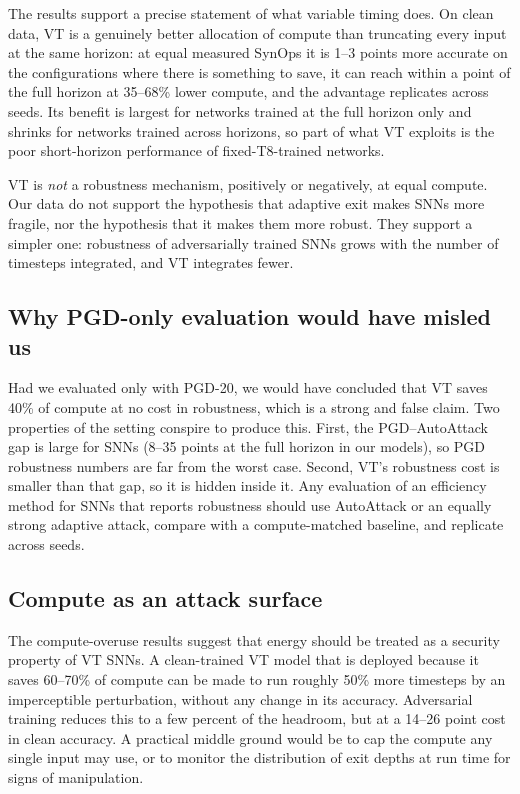 The results support a precise statement of what variable timing does. On clean data, VT is a genuinely better allocation of compute than truncating every input at the same horizon: at equal measured SynOps it is 1--3 points more accurate on the configurations where there is something to save, it can reach within a point of the full horizon at 35--68\% lower compute, and the advantage replicates across seeds. Its benefit is largest for networks trained at the full horizon only and shrinks for networks trained across horizons, so part of what VT exploits is the poor short-horizon performance of fixed-T8-trained networks.

VT is \emph{not} a robustness mechanism, positively or negatively, at equal compute. Our data do not support the hypothesis that adaptive exit makes SNNs more fragile, nor the hypothesis that it makes them more robust. They support a simpler one: robustness of adversarially trained SNNs grows with the number of timesteps integrated, and VT integrates fewer.

\subsection{Why PGD-only evaluation would have misled us}

Had we evaluated only with PGD-20, we would have concluded that VT saves 40\% of compute at no cost in robustness, which is a strong and false claim. Two properties of the setting conspire to produce this. First, the PGD--AutoAttack gap is large for SNNs (8--35 points at the full horizon in our models), so PGD robustness numbers are far from the worst case. Second, VT's robustness cost is smaller than that gap, so it is hidden inside it. Any evaluation of an efficiency method for SNNs that reports robustness should use AutoAttack or an equally strong adaptive attack, compare with a compute-matched baseline, and replicate across seeds.

\subsection{Compute as an attack surface}

The compute-overuse results suggest that energy should be treated as a security property of VT SNNs. A clean-trained VT model that is deployed because it saves 60--70\% of compute can be made to run roughly 50\% more timesteps by an imperceptible perturbation, without any change in its accuracy. Adversarial training reduces this to a few percent of the headroom, but at a 14--26 point cost in clean accuracy. A practical middle ground would be to cap the compute any single input may use, or to monitor the distribution of exit depths at run time for signs of manipulation.

